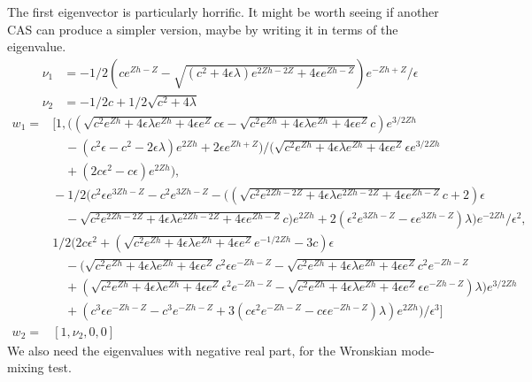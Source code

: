 \documentclass[10pt]{article}
\begin{document}
The first eigenvector is particularly horrific.
It might be worth seeing if another CAS can produce a simpler version, maybe by writing it in terms of the eigenvalue.
\begin{align*}
    \nu_1 &=-1/2 \left(c e^{Z h - Z} - \sqrt{(c^2 + 4 \epsilon \lambda) e^{2 Z h - 2 Z} +
4 \epsilon e^{Z h - Z}}\right) e^{-Z h + Z}/\epsilon
\\
    \nu_2 &= -1/2 c + 1/2 \sqrt{c^2 + 4 \lambda}
\end{align*}
\begin{align*}
    w_1 =& [1, ((\sqrt{c^2 e^{Z h} +
4 \epsilon \lambda e^{Z h} + 4 \epsilon e^Z} c \epsilon - \sqrt{c^2 e^{Z h} +
4 \epsilon \lambda e^{Z h} + 4 \epsilon e^Z} c) e^{3/2 Z h} \\
& \quad - (c^2 \epsilon - c^2 -
2 \epsilon \lambda) e^{2 Z h} + 2 \epsilon e^{Z h + Z})/(\sqrt{c^2 e^{Z h} +
4 \epsilon \lambda e^{Z h} + 4 \epsilon e^Z} \epsilon e^{3/2 Z h} \\
& \quad + (2 c \epsilon^2 -
    c \epsilon) e^{2 Z h}), \\
    &\!-1/2 (c^2 \epsilon e^{3 Z h - Z} - c^2 e^{3 Z h - Z} -
    ((\sqrt{c^2 e^{2 Z h - 2 Z} + 4 \epsilon \lambda e^{2 Z h - 2 Z} + 4 \epsilon e^{Z h
    - Z}} c + 2) \epsilon \\
    & \quad - \sqrt{c^2 e^{2 Z h - 2 Z} + 4 \epsilon \lambda e^{2 Z h -
    2 Z} + 4 \epsilon e^{Z h - Z}} c) e^{2 Z h} + 2 (\epsilon^2 e^{3 Z h - Z} -
    \epsilon e^{3 Z h - Z}) \lambda) e^{-2 Z h}/\epsilon^2, \\
    & 1/2 (2 c \epsilon^2 +
    (\sqrt{c^2 e^{Z h} + 4 \epsilon \lambda e^{Z h} + 4 \epsilon e^Z} e^{-1/2 Z h} -
    3 c) \epsilon \\
    & \quad - (\sqrt{c^2 e^{Z h} + 4 \epsilon \lambda e^{Z h} +
    4 \epsilon e^Z} c^2 \epsilon e^{-Z h - Z} - \sqrt{c^2 e^{Z h} + 4 \epsilon \lambda e^{Z h}
    + 4 \epsilon e^Z} c^2 e^{-Z h - Z} \\ 
    & \quad + (\sqrt{c^2 e^{Z h} + 4 \epsilon \lambda e^{Z h}
    + 4 \epsilon e^Z} \epsilon^2 e^{-Z h - Z} - \sqrt{c^2 e^{Z h} + 4 \epsilon \lambda e^{Z h}
    + 4 \epsilon e^Z} \epsilon e^{-Z h - Z}) \lambda) e^{3/2 Z h} \\
    & \quad + (c^3 \epsilon e^{-Z h -
    Z} - c^3 e^{-Z h - Z} + 3 (c \epsilon^2 e^{-Z h - Z} - c \epsilon e^{-Z h -
Z}) \lambda) e^{2 Z h})/\epsilon^3]
\\
w_2 =& [1, \nu_2, 0, 0]
\end{align*}
We also need the eigenvalues with negative real part, for the Wronskian mode-mixing test.
\end{document}

